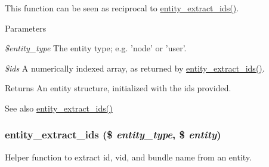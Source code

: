 This function can be seen as reciprocal to \hyperlink{common_8inc_ae8d0c984add0f9ff53a2a6dc4fb1ba58}{entity\_\-extract\_\-ids()}.


\begin{DoxyParams}{Parameters}
\item[{\em \$entity\_\-type}]The entity type; e.g. 'node' or 'user'. \item[{\em \$ids}]A numerically indexed array, as returned by \hyperlink{common_8inc_ae8d0c984add0f9ff53a2a6dc4fb1ba58}{entity\_\-extract\_\-ids()}.\end{DoxyParams}
\begin{DoxyReturn}{Returns}
An entity structure, initialized with the ids provided.
\end{DoxyReturn}
\begin{DoxySeeAlso}{See also}
\hyperlink{common_8inc_ae8d0c984add0f9ff53a2a6dc4fb1ba58}{entity\_\-extract\_\-ids()} 
\end{DoxySeeAlso}
\hypertarget{common_8inc_ae8d0c984add0f9ff53a2a6dc4fb1ba58}{
\subsubsection[{entity\_\-extract\_\-ids}]{\setlength{\rightskip}{0pt plus 5cm}entity\_\-extract\_\-ids (\$ {\em entity\_\-type}, \/  \$ {\em entity})}}
\label{common_8inc_ae8d0c984add0f9ff53a2a6dc4fb1ba58}
Helper function to extract id, vid, and bundle name from an entity.



